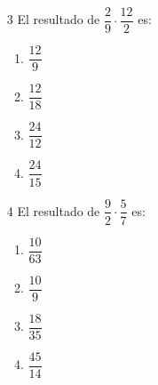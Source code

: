 \documentclass[12pt]{article}
\begin{document}
\ \\ \
\begin{multicols}{2}
		\begin{enumerate}
		\item [3]El resultado de $\dfrac{2}{9} \cdot \dfrac{12}{2}$	es:
			\begin{enumerate}
			\item $\dfrac{12}{9}$\\
			\item $\dfrac{12}{18}$\\
			\item $\dfrac{24}{12}$\\
			\item $\dfrac{24}{15}$\\ 
	\end{enumerate}
	\end{enumerate}
\begin{enumerate}
	\item [4]El resultado de $\dfrac{9}{2} \cdot \dfrac{5}{7}$	es:
	\begin{enumerate}
		\item $\dfrac{10}{63}$\\
		\item $\dfrac{10}{9}$\\
		\item $\dfrac{18}{35}$\\
		\item $\dfrac{45}{14}$\\
	\end{enumerate}
\end{enumerate}
\end{multicols}	
\end{document}
